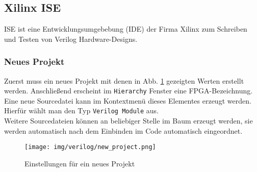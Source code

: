 \pagebreak

\subsection{Xilinx ISE}
ISE ist eine Entwicklungsumgebebung (IDE) der Firma Xilinx zum Schreiben und Testen von Verilog Hardware-Designs.

\subsubsection{Neues Projekt}
Zuerst muss ein neues Projekt mit denen in Abb. \ref{fig:new_project} gezeigten Werten erstellt werden. Anschließend erscheint im \texttt{Hierarchy} Fenster eine FPGA-Bezeichnung. Eine neue Sourcedatei kann im Kontextmenü dieses Elementes erzeugt werden. Hierfür wählt man den Typ \texttt{Verilog Module} aus.\\
Weitere Sourcedateien können an beliebiger Stelle im Baum erzeugt werden, sie werden automatisch nach dem Einbinden im Code automatisch eingeordnet.

\begin{figure}[H]
	\centering
	\texttt{[image: img/verilog/new\_project.png]}
	\caption{Einstellungen für ein neues Projekt}
	\label{fig:new_project}
\end{figure}

